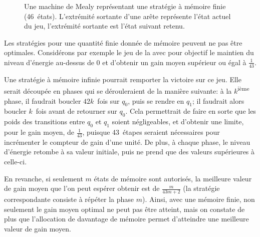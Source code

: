 \begin{figure}[ht]
\centering
{}
\caption[Une machine de Mealy représentant une stratégie à mémoire finie.]{Une machine de Mealy représentant une stratégie à mémoire finie (46~états). L'extrémité sortante d'une arête représente l'état actuel du jeu, l'extrémité sortante est l'état suivant retenu.}%
\label{tj:fig:memory42}
\end{figure}

\begin{remark}
Les stratégies pour une quantité finie donnée de mémoire peuvent ne pas être optimales.
Considérons par exemple le jeu de la  avec pour objectif le maintien du niveau d'énergie au-dessus de $0$ et d'obtenir un gain moyen supérieur ou égal à $\frac1{43}$.

Une stratégie à mémoire infinie pourrait remporter la victoire sur ce jeu.
Elle serait découpée en phases qui se dérouleraient de la manière suivante: à la $k$\textsuperscript{ième} phase, il faudrait boucler $42k$~fois sur $q_0$, puis se rendre en $q_1$; il faudrait alors boucler $k$~fois avant de retourner sur $q_0$.
Cela permettrait de faire en sorte que les poids des transitions entre $q_0$ et $q_1$ soient négligeables, et d'obtenir une limite, pour le gain moyen, de $\frac1{43}$, puisque 43~étapes seraient nécessaires pour incrémenter le compteur de gain d'une unité.
De plus, à chaque phase, le niveau d'énergie retombe à sa valeur initiale, puis ne prend que des valeurs supérieures à celle-ci.

En revanche, si seulement $m$ états de mémoire sont autorisés, la meilleure valeur de gain moyen que l'on peut espérer obtenir est de $\frac{m}{43m+2}$ (la stratégie correspondante consiste à répéter la phase $m$).
Ainsi, avec une mémoire finie, non seulement le gain moyen optimal ne peut pas être atteint, mais on constate de plus que l'allocation de davantage de mémoire permet d'atteindre une meilleure valeur de gain moyen.
\end{remark}

